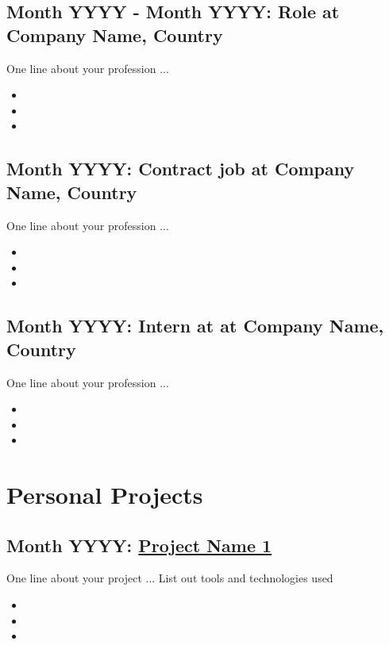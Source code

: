 \documentclass[11pt, a4paper]{article}
\begin{document}
\subsection*{Month YYYY - Month YYYY: Role at Company Name, Country}
One line about your profession ...
\begin{itemize}\addtolength{\itemsep}{-0.5\baselineskip}
\item
\item
\item
\end{itemize}
\subsection*{Month YYYY: Contract job at Company Name, Country}
One line about your profession ...
\begin{itemize}\addtolength{\itemsep}{-0.5\baselineskip}
\item
\item
\item
\end{itemize}
\subsection*{Month YYYY: Intern at at Company Name, Country}
One line about your profession ...
\begin{itemize}\addtolength{\itemsep}{-0.5\baselineskip}
\item
\item
\item
\end{itemize}

\dotfill

\section*{Personal Projects}
\subsection*{Month YYYY: {\href{http://project.website.com}{Project Name 1}}}
One line about your project ... List out tools and technologies used
\begin{itemize}\addtolength{\itemsep}{-0.5\baselineskip}
\item
\item
\item
\end{itemize}
\end{document}
